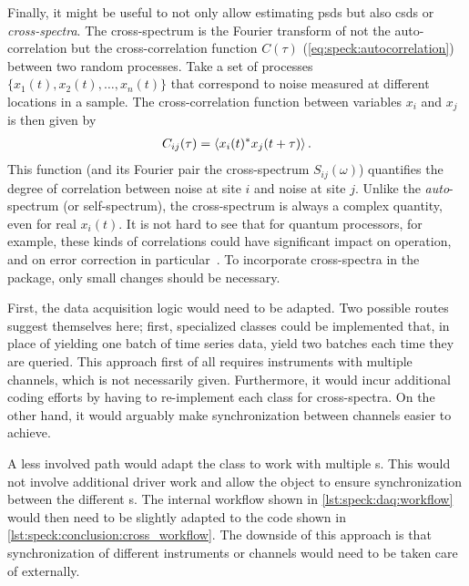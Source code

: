Finally, it might be useful to not only allow estimating \glspl{psd} but also \glspl{csd} or \emph{cross-spectra}.
The cross-spectrum
is the Fourier transform of not the auto-correlation but the cross-correlation function $C(\tau)$ (\cref{eq:speck:autocorrelation}) between two random processes.
Take a set of processes $\{x_1(t), \allowbreak x_2(t), \allowbreak \dotsc, \allowbreak x_n(t)\}$ that correspond to noise measured at different locations in a sample.
The cross-correlation function between variables $x_i$ and $x_j$ is then given by
\begin{align}\label{eq:speck:conclusion:crosscorrelation}
    C_{ij}(\tau) = \expval{x_i(t)\conjugate x_j(t + \tau)}.
\end{align}
This function (and its Fourier pair the cross-spectrum $S_{ij}(\omega)$) quantifies the degree of correlation between noise at site $i$ and noise at site $j$.
Unlike the \emph{auto}-spectrum (or self-spectrum), the cross-spectrum is always a complex quantity, even for real $x_i(t)$.
It is not hard to see that for quantum processors, for example, these kinds of correlations could have significant impact on operation, and on error correction in particular~\cite{Aharonov2006,Nickerson2019,Clader2021}.
To incorporate cross-spectra in the \pyspeck package, only small changes should be necessary.

First, the data acquisition logic would need to be adapted.
Two possible routes suggest themselves here; first, specialized  classes could be implemented that, in place of yielding one batch of time series data, yield two batches each time they are queried.
This approach first of all requires instruments with multiple channels,
which is not necessarily given.
Furthermore, it would incur additional coding efforts by having to re-implement each  class for cross-spectra.
On the other hand, it would arguably make synchronization between channels easier to achieve.

A less involved path would adapt the  class to work with multiple s.
This would not involve additional driver work
and allow the  object to ensure synchronization between the different s.
The internal workflow shown in \cref{lst:speck:daq:workflow} would then need to be slightly adapted to the code shown in \cref{lst:speck:conclusion:cross_workflow}.
The downside of this approach is that synchronization of different instruments or channels would need to be taken care of externally.

